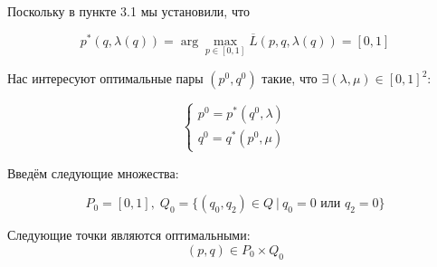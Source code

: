 \begin{flushleft}
	Поскольку в пункте 3.1 мы установили, что 
	
	$$p^*(q,\lambda(q))=\arg \max \limits_{p \in [0,1]}
		\overline{L}(p, q, \lambda(q))=[0,1]
	$$

	Нас интересуют оптимальные пары $(p^0,q^0)$ такие, что 
	$\exists (\lambda, \mu) \in [0,1]^2 $:
	
	$$\begin{cases}
	p^0=p^*(q^0,\lambda) \\
	q^0=q^*(p^0,\mu)
	\end{cases}$$
	
	Введём следующие множества:
	
	$$P_0=[0,1], \; Q_0=\{(q_0,q_2) \in Q \: | \: q_0=0 \textrm{ или } q_2 = 0\}$$
	
	Следующие точки являются оптимальными:
	$$(p, q) \in P_0 \times Q_0$$
		

\end{flushleft}



















